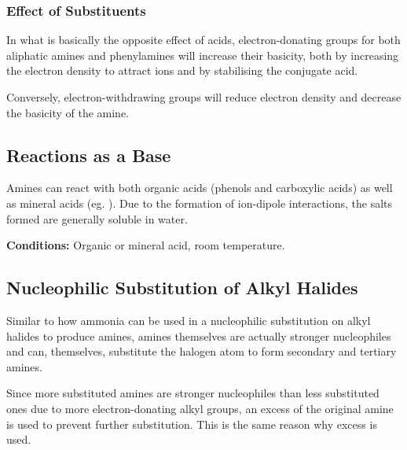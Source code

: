 			\subsubsection{Effect of Substituents}

				In what is basically the opposite effect of acids, electron-donating groups for both aliphatic amines and phenylamines will
				increase their basicity, both by increasing the electron density to attract  ions and by stabilising the conjugate acid.

				Conversely, electron-withdrawing groups will reduce electron density and decrease the basicity of the amine.




		\pagebreak
		\subsection{Reactions as a Base}

			Amines can react with both organic acids (phenols and carboxylic acids) as well as mineral acids (eg. ). Due to the
			formation of ion-dipole interactions, the salts formed are generally soluble in water.

			\vspace{1.5em}
			\vbox{\textbf{Conditions:}	\tabto{35mm}Organic or mineral acid, room temperature.}




		\subsection{Nucleophilic Substitution of Alkyl Halides}

			Similar to how ammonia can be used in a nucleophilic substitution on alkyl halides to produce amines, amines themselves are actually
			stronger nucleophiles and can, themselves, substitute the halogen atom to form secondary and tertiary amines.

			Since more substituted amines are stronger nucleophiles than less substituted ones due to more electron-donating alkyl groups, an
			excess of the original amine is used to prevent further substitution. This is the same reason why excess  is used.


